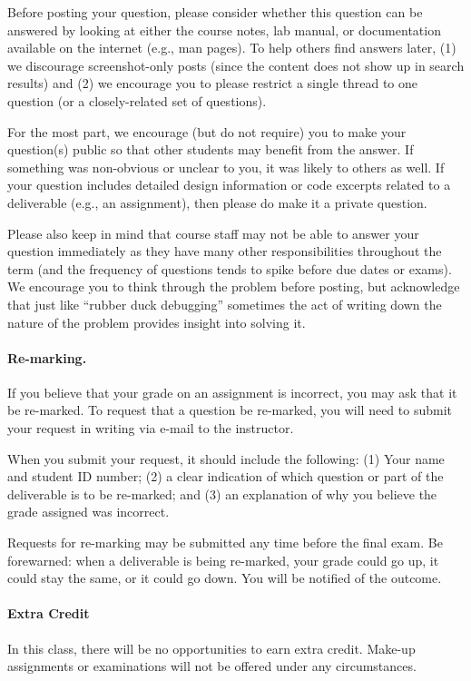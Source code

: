 \documentclass[letterpaper,10pt]{article}
\begin{document}
Before posting your question, please consider whether this question can be answered by looking at either the course notes, lab manual, or documentation available on the internet (e.g., man pages). To help others find answers later, (1) we discourage screenshot-only posts (since the content does not show up in search results) and (2) we encourage you to please restrict a single thread to one question (or a closely-related set of questions).

For the most part, we encourage (but do not require) you to make your question(s) public so that other students may benefit from the answer. If something was non-obvious or unclear to you, it was likely to others as well. If your question includes detailed design information or code excerpts related to a deliverable (e.g., an assignment), then please do make it a private question.

Please also keep in mind that course staff may not be able to answer your question immediately as they have many other responsibilities throughout the term (and the frequency of questions tends to spike before due dates or exams). We encourage you to think through the problem before posting, but acknowledge that just like ``rubber duck debugging'' sometimes the act of writing down the nature of the problem provides insight into solving it.

\paragraph{Re-marking.}
If you believe that your grade on an assignment is incorrect, you may ask that it be re-marked. To request that a question be re-marked, you will need to submit your request in writing via e-mail to the instructor.

When you submit your request, it should include the following: (1) Your name and student ID number; (2) a clear indication of which question or part of the deliverable is to be re-marked; and (3) an explanation of why you believe the grade assigned was incorrect.

Requests for re-marking may be submitted any time before the final exam. Be forewarned: when a deliverable is being re-marked, your grade could go up, it could stay the same, or it could go down. You will be notified of the outcome.

\paragraph{Extra Credit}
In this class, there will be no opportunities to earn extra credit. Make-up assignments or examinations will not be offered under any circumstances.
\end{document}
